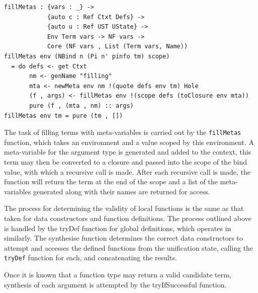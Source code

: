 \documentclass[a4paper]{article}
\begin{document}
\begin{center}
  \begin{verbatim}
fillMetas : {vars : _} -> 
            {auto c : Ref Ctxt Defs} ->
            {auto u : Ref UST UState} ->
            Env Term vars -> NF vars ->
            Core (NF vars , List (Term vars, Name))
fillMetas env (NBind n (Pi n' pinfo tm) scope) 
  = do defs <- get Ctxt 
       nm <- genName "filling"
       mta <- newMeta env nm !(quote defs env tm) Hole
       (f , args) <- fillMetas env !(scope defs (toClosure env mta))
       pure (f , (mta , nm) :: args)
fillMetas env tm = pure (tm , [])
  \end{verbatim}
\end{center}

The task of filling terms with meta-variables is carried out by the
\texttt{fillMetas} function, which takes an environment and a value scoped
by this environment. A meta-variable for the argument type is generated
and added to the context, this term may then be converted to a closure and passed
into the scope of the bind value, with which a recursive call is made.
After each recursive call is made, the function will return the
term at the end of the scope and a list of the meta-variables generated along with
their names are returned for access. 

The process for determining the validity of local functions is the same as
that taken for data constructors
and function definitions. The process outlined above is handled by
the tryDef function for global definitions, which operates in similarly.
The synthesise function determines the correct data constructors to attempt
and accesses the defined functions from the unification state, calling the
\texttt{tryDef} function for each, and concatenating the results.

Once it is known that a function type may return a valid candidate term, synthesis
of each argument is attempted by the tryIfSuccessful function.
\end{document}
